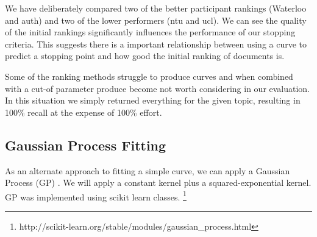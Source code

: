 \begin{table}[H]
\caption{Evaluation of curve fitting for different CLEF 2017 runs. lower = lower-bound confidence interval. Sample size = 3. Results are taken as averages over all topics for search method. with 0.5\% cut-off}

\end{table}

We have deliberately compared two of the better participant rankings (Waterloo and auth) and two of the lower performers (ntu and ucl). We can see the quality of the initial rankings significantly influences the performance of our stopping criteria. This suggests there is a important relationship between using a curve to predict a stopping point and how good the initial ranking of documents is. 

Some of the ranking methods struggle to produce curves and when combined with a cut-of parameter produce become not worth considering in our evaluation. In this situation we simply returned everything for the given topic, resulting in 100\% recall at the expense of 100\% effort.


\subsection{Gaussian Process Fitting}

As an alternate approach to fitting a simple curve, we can apply a Gaussian Process (GP) \cite{ebden2008gaussian}. We will apply a constant kernel plus a squared-exponential kernel. GP was implemented using scikit learn classes. \footnote{http://scikit-learn.org/stable/modules/gaussian\_process.html}


